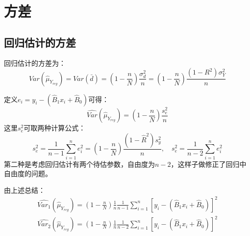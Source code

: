 \section{方差}
\subsection{回归估计的方差}
\begin{theorem}
	回归估计的方差为：
	\begin{equation*}
		Var(\hat{\mu}_{Y_{reg}})=Var(\bar{d})=\left(1-\frac{n}{N}\right)\frac{\sigma_d^2}{n}=\left(1-\frac{n}{N}\right)\frac{(1-R^2)\sigma_Y^2}{n}
	\end{equation*}
\end{theorem}
定义$e_i=y_i-(\hat{B}_1x_i+\hat{B}_0)$可得：
\begin{equation*}
	\widehat{Var}(\hat{\mu}_{Y_{reg}})=\left(1-\frac{n}{N}\right)\frac{s_e^2}{n}
\end{equation*}
这里$s_e^2$可取两种计算公式：
\begin{equation*}
	s_e^2=\frac{1}{n-1}\sum_{i=1}^ne_i^2=\left(1-\frac{n}{N}\right)\frac{(1-\hat{R}^2)s_y^2}{n},\quad
	s_e^2=\frac{1}{n-2}\sum_{i=1}^ne_i^2
\end{equation*}
第二种是考虑回归估计有两个待估参数，自由度为$n-2$，这样子做修正了回归中自由度的问题。\par
由上述总结：
\begin{gather*}
	\widehat{Var_1}(\hat{\mu}_{Y_{reg}})=\left(1-\frac{n}{N}\right)\frac{1}{n}\frac{1}{n-1}\sum_{i=1}^n\left[y_i-(\hat{B}_1x_i+\hat{B}_0)\right]^2 \\
	\widehat{Var_2}(\hat{\mu}_{Y_{reg}})=\left(1-\frac{n}{N}\right)\frac{1}{n}\frac{1}{n-2}\sum_{i=1}^n\left[y_i-(\hat{B}_1x_i+\hat{B}_0)\right]^2 
\end{gather*}

